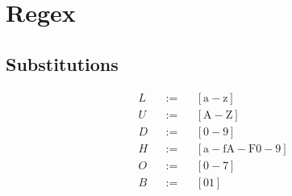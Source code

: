\documentclass[]{article}
\begin{document}
\section{Regex}
\subsection{Substitutions}
\begin{align}
    &L &&:= &&[\text{a}-\text{z}]                     \\
    &U &&:= &&[\text{A}-\text{Z}]                     \\
    &D &&:= &&[\text{0}-\text{9}]                     \\
    &H &&:= &&[\text{a}-\text{fA}-\text{F0}-\text{9}] \\
    &O &&:= &&[\text{0}-\text{7}]                     \\
    &B &&:= &&[\text{01}]
\end{align}
\end{document}
